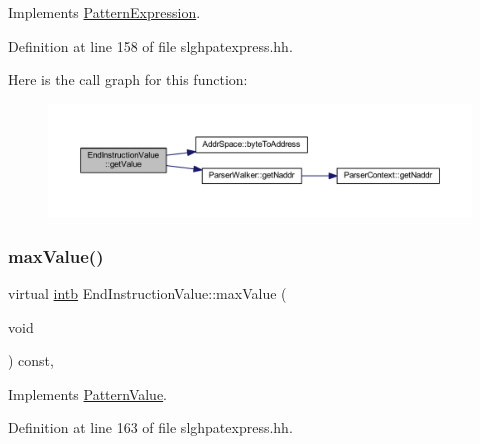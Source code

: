 Implements \mbox{\hyperlink{class_pattern_expression_a8332c6ea4c5a7e9dfc690df2a6458bb8}{Pattern\+Expression}}.



Definition at line 158 of file slghpatexpress.\+hh.

Here is the call graph for this function\+:
\nopagebreak
\begin{figure}[H]
\begin{center}
\leavevmode
\includegraphics[width=350pt]{class_end_instruction_value_ab5a3514129e205fe42efa1dba471e496_cgraph}
\end{center}
\end{figure}
\mbox{\label{class_end_instruction_value_af6230d95fcb68cfbcf0522e74df0232c}} 
\subsubsection{\texorpdfstring{maxValue()}{maxValue()}}
{\footnotesize\ttfamily virtual \mbox{\hyperlink{types_8h_aa925ba3e627c2df89d5b1cfe84fb8572}{intb}} End\+Instruction\+Value\+::max\+Value (\begin{DoxyParamCaption}\item[{void}]{ }\end{DoxyParamCaption}) const\hspace{0.3cm}{\ttfamily [inline]}, {\ttfamily [virtual]}}



Implements \mbox{\hyperlink{class_pattern_value_a865e8f34e031ef31f77dcaa93d76820d}{Pattern\+Value}}.



Definition at line 163 of file slghpatexpress.\+hh.

\mbox{\label{class_end_instruction_value_a24592780f2f2f6e5baa22337d621c0e9}} 
